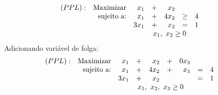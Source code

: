 \documentclass[12pt]{exam}
\begin{document}
\begin{questions}
\begin{solution}
	\begin{equation*}	
			\begin{array}{c r r c r c c c }
			(PPL) :& \text{Maximizar} & x_1  & + &  x_2    &  & &	\\
			           & \text{sujeito a:}  & x_1 & + & 4x_2  &  \geq  &	 4 \\
			           &                              & 3x_1 & + & x_2 &  = &	 1 \\
			           &                              & \multicolumn{6}{c}{x_1,~x_2 \geq 0}
			\end{array}	
	\end{equation*}
Adicionando variável de folga:
	\begin{equation*}	
			\begin{array}{c r r c r crc c c }
			(PPL) :& \text{Maximizar} & x_1   & + &  x_2   & + & 0x_3 &  & &	\\
			           & \text{sujeito a:}  & x_1   & + & 4x_2  & + &  x_3 &  =  &	 4 \\
			           &                              & 3x_1 & + & x_2    &     &        &  =  &	 1 \\
			           &                              & \multicolumn{6}{c}{x_1,~x_2,~x_3 \geq 0}
			\end{array}	
	\end{equation*}
	

\end{solution}
\end{questions}
\end{document}
